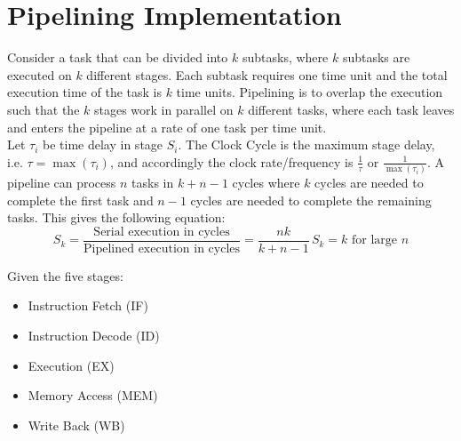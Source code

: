 \documentclass[12pt letter]{report}
\begin{document}
\section{Pipelining Implementation}

Consider a task that can be divided into $k$ subtasks, where $k$ subtasks are executed on $k$ different stages. Each subtask requires one time unit and the total
execution time of the task is $k$ time units. Pipelining is to overlap the execution such that the $k$ stages work in parallel on $k$ different tasks, where each
task leaves and enters the pipeline at a rate of one task per time unit. \\


Let $ \tau_i$ be time delay in stage $S_i$. The Clock Cycle is the maximum stage delay, i.e. $ \tau = \max \left( \tau_i \right) $, and accordingly
the clock rate/frequency is $\frac{1}{\tau}$ or $\frac{1}{\max \left( \tau_i \right) }$. A pipeline can process $n$ tasks in $k + n - 1$ cycles where
$k$ cycles are needed to complete the first task and $n - 1$ cycles are needed to complete the remaining tasks. This gives the following equation:
\[
  S_k = \frac{\text{Serial execution in cycles}}{\text{Pipelined execution in cycles}} = \frac{nk}{k + n - 1}\, S_k = k \text{ for large } n
\]

Given the five stages:
\begin{itemize}
  \item Instruction Fetch (IF)
  \item Instruction Decode (ID)
  \item Execution (EX)
  \item Memory Access (MEM)
  \item Write Back (WB)
\end{itemize}

\end{document}
